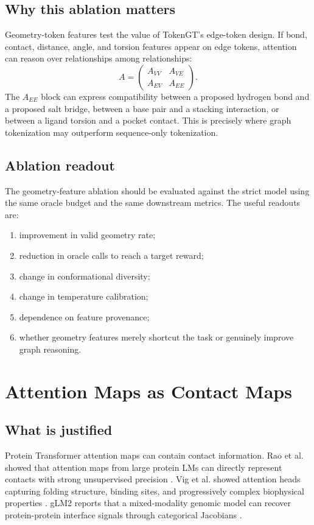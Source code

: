 \documentclass[11pt]{article}
\begin{document}
\subsection{Why this ablation matters}

Geometry-token features test the value of TokenGT's edge-token design. If bond, contact, distance, angle, and torsion features appear on edge tokens, attention can reason over relationships among relationships:
\[
A=
\begin{pmatrix}
A_{VV} & A_{VE}\\
A_{EV} & A_{EE}
\end{pmatrix}.
\]
The $A_{EE}$ block can express compatibility between a proposed hydrogen bond and a proposed salt bridge, between a base pair and a stacking interaction, or between a ligand torsion and a pocket contact. This is precisely where graph tokenization may outperform sequence-only tokenization.

\subsection{Ablation readout}

The geometry-feature ablation should be evaluated against the strict model using the same oracle budget and the same downstream metrics. The useful readouts are:
\begin{enumerate}[leftmargin=2em]
  \item improvement in valid geometry rate;
  \item reduction in oracle calls to reach a target reward;
  \item change in conformational diversity;
  \item change in temperature calibration;
  \item dependence on feature provenance;
  \item whether geometry features merely shortcut the task or genuinely improve graph reasoning.
\end{enumerate}

\section{Attention Maps as Contact Maps}

\subsection{What is justified}

Protein Transformer attention maps can contain contact information. Rao et al. showed that attention maps from large protein LMs can directly represent contacts with strong unsupervised precision \cite{rao2021unsupervised}. Vig et al. showed attention heads capturing folding structure, binding sites, and progressively complex biophysical properties \cite{vig2021bertology}. gLM2 reports that a mixed-modality genomic model can recover protein-protein interface signals through categorical Jacobians \cite{cornman2024omg}.
\end{document}
